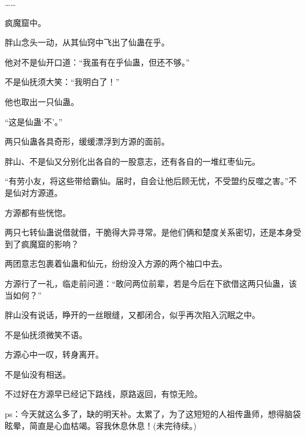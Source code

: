 \begin{this_body}
……

疯魔窟中。

胖山念头一动，从其仙窍中飞出了仙蛊在乎。

他对不是仙开口道：“我虽有在乎仙蛊，但还不够。”

不是仙抚须大笑：“我明白了！”

他也取出一只仙蛊。

“这是仙蛊‘不’。”

两只仙蛊各具奇形，缓缓漂浮到方源的面前。

胖山、不是仙又分别化出各自的一股意志，还有各自的一堆红枣仙元。

“有劳小友，将这些带给霸仙。届时，自会让他后顾无忧，不受盟约反噬之害。”不是仙对方源道。

方源都有些恍惚。

两只七转仙蛊说借就借，干脆得大异寻常。是他们俩和楚度关系密切，还是本身受到了疯魔窟的影响？

两团意志包裹着仙蛊和仙元，纷纷没入方源的两个袖口中去。

方源行了一礼，临走前问道：“敢问两位前辈，若是今后在下欲借这两只仙蛊，该当如何？”

胖山没有说话，睁开的一丝眼缝，又都闭合，似乎再次陷入沉眠之中。

不是仙抚须微笑不语。

方源心中一叹，转身离开。

不是仙没有相送。

不过好在方源早已经记下路线，原路返回，有惊无险。

ps：今天就这么多了，缺的明天补。太累了，为了这短短的人祖传蛊师，想得脑袋眩晕，简直是心血枯竭。容我休息休息！(未完待续。)

\end{this_body}


